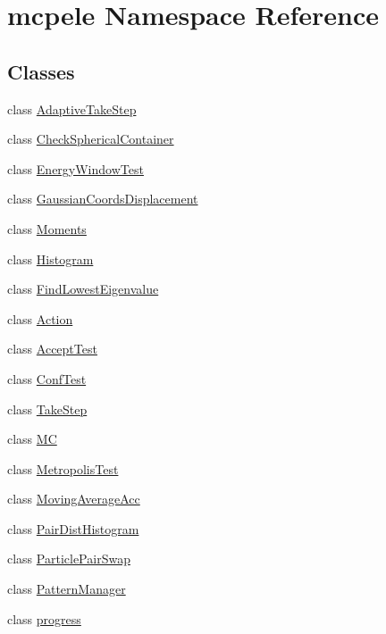 \hypertarget{namespacemcpele}{\section{mcpele \-Namespace \-Reference}
\label{namespacemcpele}
}
\subsection*{\-Classes}
\begin{DoxyCompactItemize}
\item 
class \hyperlink{classmcpele_1_1AdaptiveTakeStep}{\-Adaptive\-Take\-Step}
\item 
class \hyperlink{classmcpele_1_1CheckSphericalContainer}{\-Check\-Spherical\-Container}
\item 
class \hyperlink{classmcpele_1_1EnergyWindowTest}{\-Energy\-Window\-Test}
\item 
class \hyperlink{classmcpele_1_1GaussianCoordsDisplacement}{\-Gaussian\-Coords\-Displacement}
\item 
class \hyperlink{classmcpele_1_1Moments}{\-Moments}
\item 
class \hyperlink{classmcpele_1_1Histogram}{\-Histogram}
\item 
class \hyperlink{classmcpele_1_1FindLowestEigenvalue}{\-Find\-Lowest\-Eigenvalue}
\item 
class \hyperlink{classmcpele_1_1Action}{\-Action}
\item 
class \hyperlink{classmcpele_1_1AcceptTest}{\-Accept\-Test}
\item 
class \hyperlink{classmcpele_1_1ConfTest}{\-Conf\-Test}
\item 
class \hyperlink{classmcpele_1_1TakeStep}{\-Take\-Step}
\item 
class \hyperlink{classmcpele_1_1MC}{\-M\-C}
\item 
class \hyperlink{classmcpele_1_1MetropolisTest}{\-Metropolis\-Test}
\item 
class \hyperlink{classmcpele_1_1MovingAverageAcc}{\-Moving\-Average\-Acc}
\item 
class \hyperlink{classmcpele_1_1PairDistHistogram}{\-Pair\-Dist\-Histogram}
\item 
class \hyperlink{classmcpele_1_1ParticlePairSwap}{\-Particle\-Pair\-Swap}
\item 
class \hyperlink{classmcpele_1_1PatternManager}{\-Pattern\-Manager}
\item 
class \hyperlink{classmcpele_1_1progress}{progress}
\item 

\end{DoxyCompactItemize}
